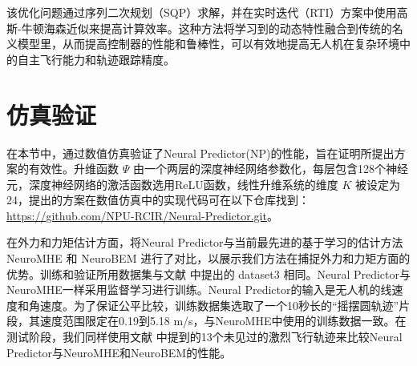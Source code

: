 \documentclass[lang=chs, degree=master, blindreview=false, winfonts=true]{yanputhesis}
\begin{document}
该优化问题通过序列二次规划（SQP）求解，并在实时迭代（RTI）方案中使用高斯-牛顿海森近似来提高计算效率。这种方法将学习到的动态特性融合到传统的名义模型里，从而提高控制器的性能和鲁棒性，可以有效地提高无人机在复杂环境中的自主飞行能力和轨迹跟踪精度。

\section{仿真验证}


在本节中，通过数值仿真验证了Neural Predictor(NP)的性能，旨在证明所提出方案的有效性。升维函数 $\Psi$ 由一个两层的深度神经网络参数化，每层包含128个神经元，深度神经网络的激活函数选用ReLU函数，线性升维系统的维度 $K$ 被设定为24，提出的方案在数值仿真中的实现代码可在以下仓库找到：\href{https://github.com/NPU-RCIR/Neural-Predictor.git}{https://github.com/NPU-RCIR/Neural-Predictor.git}。

在外力和力矩估计方面，将Neural Predictor与当前最先进的基于学习的估计方法NeuroMHE \cite{Wang2024e} 和 NeuroBEM \cite{Bauersfeld2021} 进行了对比，以展示我们方法在捕捉外力和力矩方面的优势。训练和验证所用数据集与文献  中提出的 dataset3 相同。Neural Predictor与NeuroMHE一样采用监督学习进行训练。Neural Predictor的输入是无人机的线速度和角速度。为了保证公平比较，训练数据集选取了一个10秒长的“摇摆圆轨迹”片段，其速度范围限定在0.19到5.18 m/s，与NeuroMHE中使用的训练数据一致。在测试阶段，我们同样使用文献  中提到的13个未见过的激烈飞行轨迹来比较Neural Predictor与NeuroMHE和NeuroBEM的性能。
\end{document}

